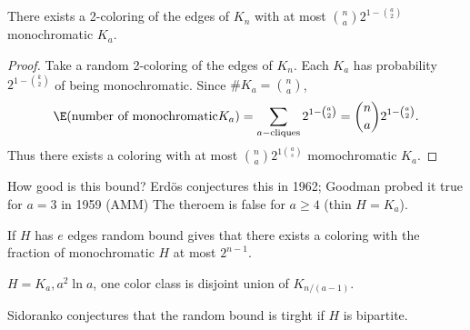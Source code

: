 \begin{thm}
There exists a 2-coloring  of the edges of $K_n$ with at most $\binom na2^{1-\binom a2}$ monochromatic $K_a$.
\end{thm}
\begin{proof}
Take a random 2-coloring of the edges of $K_n$. Each $K_a$ has probability $2^{1-\binom k2}$ of being monochromatic. Since $\#K_a=\binom na$,
\[
\E(\text{number of monochromatic} K_a)=\sum_{a-\text{cliques}}2^{1-\binom a2}
=\binom na 2^{1-\binom a2}.
\]
Thus there exists a coloring with at most $\binom na2^{1\binom as}$ momochromatic $K_a$.
\end{proof}
\begin{rem}How good is this bound? Erd\"os conjectures this in 1962; Goodman probed it true for $a=3$ in 1959 (AMM) The theroem is false for $a\geq 4$ (thin $H=K_a$). 

If $H$ has $e$ edges random bound gives that there exists a coloring with the fraction of monochromatic $H$ at most $2^{n-1}$. 

$H=K_a, a^2\ln a$, one color class is disjoint union of $K_{n/(a-1)}$.

Sidoranko conjectures that the random bound is tirght if $H$ is bipartite.
\end{rem}
